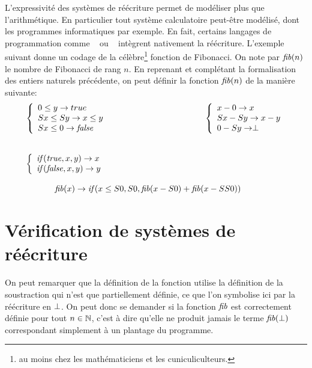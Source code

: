L'expressivité des systèmes de réécriture permet de modéliser plus que l'arithmétique. 
En particulier tout système calculatoire peut-être modélisé, dont les programmes informatiques
par exemple. En fait, certains langages de programmation comme \ocaml~\cite{OCAML} ou \tom~\cite{TOM}
intègrent nativement la réécriture. L'exemple suivant donne un codage de la
célèbre\footnote{\footnotesize au moins chez les mathématiciens et les cuniculiculteurs.} fonction de Fibonacci.
On note par $\mathit{fib}(n)$ le nombre de Fibonacci de rang $n$. En reprenant et complétant la formalisation des entiers
naturels précédente, on peut définir la fonction $\mathit{fib}(n)$ de la manière suivante:
\[
\begin{array}{l}
  \left\{\begin{array}{l}
      0 \le y \rw true\\
      Sx \le Sy \rw x \le y\\
      Sx \le 0 \rw \false
    \end{array}\right.
  \hspace*{4cm}
  \left\{\begin{array}{l}
      x - 0 \rw x\\
      Sx - Sy \rw x - y\\
      0 - Sy \rw \bottom
    \end{array}\right.\\
  \\\\
  \left\{\begin{array}{l}
      \ifte(\true, x, y) \rw x\\
      \ifte(\false,x, y) \rw y
    \end{array}\right.\\\\
  \hspace*{1.2cm}\fib(x) \rw \ifte(x\le S0, S0, \fib(x - S0) + \fib (x - SS0))
\end{array}
\]

\section{Vérification de systèmes de réécriture}

On peut remarquer que la définition de la fonction utilise la définition de la soustraction qui n'est que partiellement
définie, ce que l'on symbolise ici par la réécriture en $\perp$. On peut donc se demander si la fonction $\mathit{fib}$ 
est correctement définie pour tout $n \in \mathbb N$, c'est à dire qu'elle ne produit jamais le terme
$\mathit{fib}(\perp)$ correspondant simplement à un plantage du programme.

